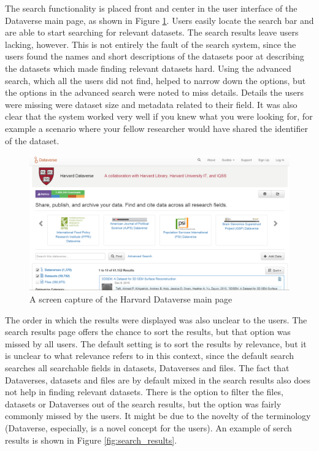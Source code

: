 The search functionality is placed front and center in the user interface of
the Dataverse main page, as shown in Figure \ref{fig:search_main_page}. Users
easily locate the search bar and are able to start searching for relevant
datasets. The search results leave users lacking, however. This is not entirely
the fault of the search system, since the users found the names and short
descriptions of the datasets poor at describing the datasets which made
finding relevant datasets hard. Using the advanced search, which all the users
did not find, helped to narrow down the options, but the options in the
advanced search were noted to miss details. Details the users were missing
were dataset size and metadata related to their field. It was also clear that
the system worked very well if you knew what you were looking for, for example
a scenario where your fellow researcher would have shared the identifier of
the dataset.

\begin{figure}
    \begin{centering}
        \includegraphics[width=\textwidth]{images/search_main_page}
    \end{centering}
    \caption{A screen capture of the Harvard Dataverse main page}
    \label{fig:search_main_page}
\end{figure}

The order in which the results were displayed was also unclear to the users.
The search results page offers the chance to sort the results, but that option
was missed by all users. The default setting is to sort the results by
relevance, but it is unclear to what relevance refers to in this context, since
the default search searches all searchable fields in datasets, Dataverses and files.
The fact that Dataverses, datasets and files are by default mixed in the search
results also does not help in finding relevant datasets. There is the option to
filter the files, datasets or Dataverses out of the search results, but the
option was fairly commonly missed by the users. It might be due to the novelty
of the terminology (Dataverse, especially, is a novel concept for the users).
An example of serch results is shown in  Figure \ref{fig:search_results}.

